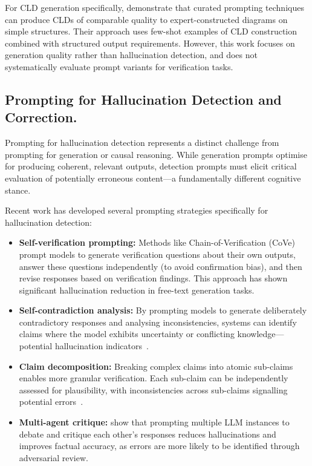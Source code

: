 For CLD generation specifically, \citet{liu2025leveraging} demonstrate that curated prompting techniques can produce CLDs of comparable quality to expert-constructed diagrams on simple structures. Their approach uses few-shot examples of CLD construction combined with structured output requirements. However, this work focuses on generation quality rather than hallucination detection, and does not systematically evaluate prompt variants for verification tasks.

\subsection{Prompting for Hallucination Detection and Correction.}

Prompting for hallucination detection represents a distinct challenge from prompting for generation or causal reasoning. While generation prompts optimise for producing coherent, relevant outputs, detection prompts must elicit critical evaluation of potentially erroneous content---a fundamentally different cognitive stance.

Recent work has developed several prompting strategies specifically for hallucination detection:

\begin{itemize}
    \item \textbf{Self-verification prompting:} Methods like Chain-of-Verification (CoVe)~\citep{dhuliawala2024chain} prompt models to generate verification questions about their own outputs, answer these questions independently (to avoid confirmation bias), and then revise responses based on verification findings. This approach has shown significant hallucination reduction in free-text generation tasks.
    
    \item \textbf{Self-contradiction analysis:} By prompting models to generate deliberately contradictory responses and analysing inconsistencies, systems can identify claims where the model exhibits uncertainty or conflicting knowledge---potential hallucination indicators~\citep{wang2023selfconsistency, huang2025hallucination}.
    
    \item \textbf{Claim decomposition:} Breaking complex claims into atomic sub-claims enables more granular verification. Each sub-claim can be independently assessed for plausibility, with inconsistencies across sub-claims signalling potential errors~\citep{dhuliawala2024chain}.
    
    \item \textbf{Multi-agent critique:} \citet{du2023multiagentdebate} show that prompting multiple LLM instances to debate and critique each other's responses reduces hallucinations and improves factual accuracy, as errors are more likely to be identified through adversarial review.
\end{itemize}

